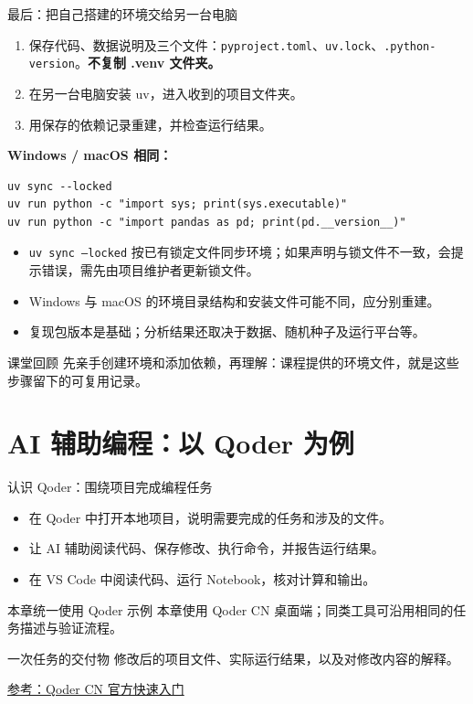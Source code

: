 \documentclass[9pt]{ctexbeamer}
\begin{document}
\begin{frame}[fragile]{最后：把自己搭建的环境交给另一台电脑}
  \begin{enumerate}
    \item 保存代码、数据说明及三个文件：\texttt{pyproject.toml}、\texttt{uv.lock}、\texttt{.python-version}。\textbf{不复制 .venv 文件夹。}
    \item 在另一台电脑安装 uv，进入收到的项目文件夹。
    \item 用保存的依赖记录重建，并检查运行结果。
  \end{enumerate}
  \textbf{Windows / macOS 相同：}
\begin{lstlisting}[language={},numbers=none]
uv sync --locked
uv run python -c "import sys; print(sys.executable)"
uv run python -c "import pandas as pd; print(pd.__version__)"
\end{lstlisting}
  \begin{itemize}
    \item \texttt{uv sync --locked} 按已有锁定文件同步环境；如果声明与锁文件不一致，会提示错误，需先由项目维护者更新锁文件。
    \item Windows 与 macOS 的环境目录结构和安装文件可能不同，应分别重建。
    \item 复现包版本是基础；分析结果还取决于数据、随机种子及运行平台等。
  \end{itemize}
  \begin{block}{课堂回顾}
    先亲手创建环境和添加依赖，再理解：课程提供的环境文件，就是这些步骤留下的可复用记录。
  \end{block}
\end{frame}

\section{AI 辅助编程：以 Qoder 为例}

\begin{frame}{认识 Qoder：围绕项目完成编程任务}
  \begin{itemize}
    \item 在 Qoder 中打开本地项目，说明需要完成的任务和涉及的文件。
    \item 让 AI 辅助阅读代码、保存修改、执行命令，并报告运行结果。
    \item 在 VS Code 中阅读代码、运行 Notebook，核对计算和输出。
  \end{itemize}
  \begin{block}{本章统一使用 Qoder 示例}
    本章使用 Qoder CN 桌面端；同类工具可沿用相同的任务描述与验证流程。
  \end{block}
  \begin{block}{一次任务的交付物}
    修改后的项目文件、实际运行结果，以及对修改内容的解释。
  \end{block}
  {\tiny\href{https://docs.qoder.cn/qoder/quickstart}{参考：Qoder CN 官方快速入门}}
\end{frame}
\end{document}

